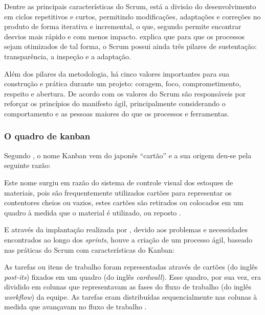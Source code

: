Dentre as principais características do Scrum, está a divisão do desenvolvimento em ciclos repetitivos e curtos, permitindo modificações, adaptações e correções no produto de forma iterativa e incremental, o que, segundo  permite encontrar desvios mais rápido e com menos impacto.  explica que para que os processos sejam otimizados de tal forma, o Scrum possui ainda três pilares de sustentação: transparência, a inspeção e a adaptação.


Além dos pilares da metodologia, há cinco valores importantes para sua construção e prática durante um projeto: coragem, foco, comprometimento, respeito e abertura.  De acordo com  os valores do Scrum são responsáveis por reforçar os princípios do manifesto ágil, principalmente considerando o comportamento e as pessoas maiores do que os processos e ferramentas. 

\subsubsection{O quadro de kanban}

Segundo , o nome Kanban vem do japonês ``cartão'' e a sua origem deu-se pela seguinte razão:

\begin{citacao}
Este nome surgiu em razão do sistema de controle visual dos estoques de materiais, pois são frequentemente utilizados cartões para representar os contentores cheios ou vazios, estes cartões são retirados ou colocados em um quadro à medida que o material é utilizado, ou reposto
\cite{peinado2007compreendendo}.
\end{citacao}
E através da implantação realizada por , devido aos problemas e necessidades encontrados ao longo dos \textsl{sprints}, houve a criação de um processo ágil, baseado nas práticas do Scrum com características do Kanban:

\begin{citacao}
As tarefas ou itens de trabalho foram representadas através de cartões (do inglês \textsl{post-its}) fixados em um quadro (do inglês \textsl{cardwall}). 
Esse quadro, por sua vez, era dividido em colunas que representavam as fases do fluxo de trabalho (do inglês \textsl{workflow}) da equipe. 
As tarefas eram distribuídas sequencialmente nas colunas à medida que avançavam no fluxo de trabalho \cite{silva2012beneficios}.
\end{citacao}

